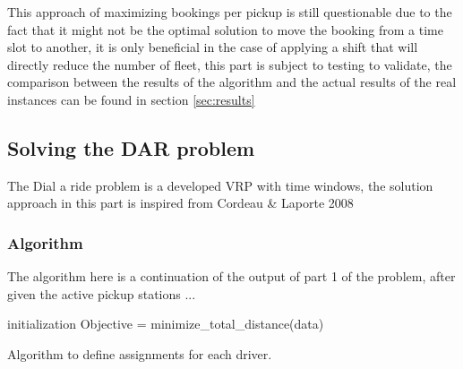 \documentclass{article}
\begin{document}

This approach of maximizing bookings per pickup is still questionable due to the fact that it might not be the optimal solution to move the booking from a time slot to another, it is only beneficial in the case of applying a shift that will directly reduce the number of fleet, this part is subject to testing to validate, the comparison between the results of the algorithm and the actual results of the real instances can be found in section \ref{sec:results}

\subsection{Solving the DAR problem}

The Dial a ride problem is a developed VRP with time windows, the solution approach in this part is inspired from Cordeau \& Laporte 2008 \cite{2008_Cordeau_Laporte}

\subsubsection{Algorithm}

The algorithm here is a continuation of the output of part 1 of the problem, after given the active pickup stations ...


\begin{algorithm}[H]
\label{alg:darp}
\SetAlgoLined
\LinesNumbered
{}
\BlankLine
 initialization\;
Objective = minimize\_total\_distance(data)\;
 \caption{Algorithm to define assignments for each driver.}
\end{algorithm}
\end{document}
